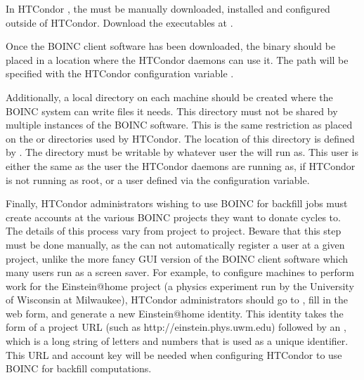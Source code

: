 
In HTCondor \VersionNotice, 
the  must be manually downloaded, 
installed and configured outside of HTCondor.
Download the  executables at 
.

Once the BOINC client software has been downloaded, the
 binary should be placed in a location where the
HTCondor daemons can use it.
The path will be specified with the HTCondor configuration variable
.

Additionally, a local directory on each machine should be created
where the BOINC system can write files it needs.
This directory must not be shared by multiple instances of the BOINC
software. This is the same restriction as placed on
the  or  directories used by HTCondor.
The location of this directory is defined by
.
The directory must be writable by whatever user the
 will run as.
This user is either the same as the user the HTCondor daemons are
running as, if HTCondor is not running as root, or a user defined via
the  configuration variable.

Finally, HTCondor administrators wishing to use BOINC for backfill jobs
must create accounts at the various BOINC projects they want to donate
cycles to.
The details of this process vary from project to project.
Beware that this step must be done manually, as the 
 can not automatically
register a user at a given project, 
unlike the more fancy GUI version
of the BOINC client software which many users run as a screen saver. 
For example, to configure machines to perform work for the
Einstein@home project (a physics experiment run by the University of
Wisconsin at Milwaukee), HTCondor administrators should go to
, fill in
the web form, and generate a new Einstein@home identity.
This identity takes the form of a project URL (such as
http://einstein.phys.uwm.edu) followed by an ,
which is a long string of letters and numbers that is used as a unique
identifier. 
This URL and account key will be needed when configuring HTCondor to use
BOINC for backfill computations.


